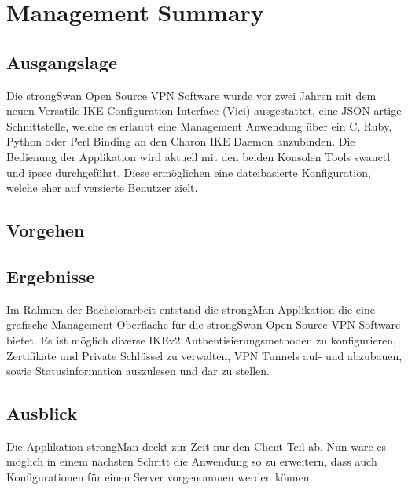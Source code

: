 \section{Management Summary}
\subsection*{Ausgangslage}
Die strongSwan Open Source VPN Software wurde vor zwei Jahren mit dem neuen Versatile
IKE Configuration Interface (Vici) ausgestattet, eine JSON-artige Schnittstelle, welche es erlaubt eine Management Anwendung über ein C, Ruby, Python oder Perl Binding an den Charon
IKE Daemon anzubinden.
Die Bedienung der Applikation wird aktuell mit den beiden Konsolen Tools swanctl und ipsec durchgeführt. Diese ermöglichen eine dateibasierte Konfiguration, welche eher auf versierte Benutzer zielt. 

\subsection*{Vorgehen}



\subsection*{Ergebnisse}
Im Rahmen der Bachelorarbeit entstand die strongMan Applikation die eine grafische Management Oberfläche für die strongSwan Open Source VPN Software bietet. Es ist möglich diverse IKEv2 Authentisierungsmethoden zu konfigurieren, Zertifikate und Private Schlüssel zu verwalten, VPN Tunnels auf- und abzubauen, sowie Statusinformation auszulesen und dar zu stellen.


\subsection*{Ausblick}
Die Applikation strongMan deckt zur Zeit nur den Client Teil ab. Nun wäre es möglich in einem nächsten Schritt die Anwendung so zu erweitern, dass auch Konfigurationen für einen Server vorgenommen werden können.
\newpage